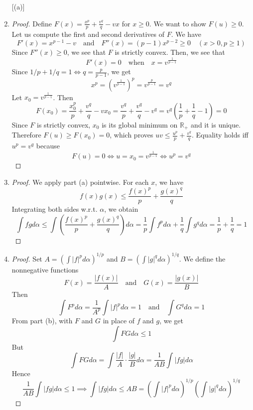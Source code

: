 \documentclass[11pt]{article}
\begin{document}
\begin{exercise}{6.10}
\begin{enumerate} [(a)]
    \item \begin{proof}
        Define $F(x) = \frac{x^p}{p} + \frac{v^q}{q} - vx$ for $x \ge 0$. We want to show $F(u) \ge 0$. Let us compute the first and second derivatives of $F$. We have $$F'(x) = x^{p- 1} - v \quad \text{and} \quad F''(x) = (p - 1)x^{p - 2} \ge 0 \quad(x > 0, p \ge1)$$ Since $F''(x) \ge 0$, we see that $F$ is strictly convex. Then, we see that $$F'(x) = 0 \quad \text{when} \quad x = v^{\frac{1}{p-1}}$$ Since $1/p + 1/q = 1 \iff q = \frac{p}{p - 1}$, we get $$x^p = \left( v^{\frac{1}{p - 1}} \right)^p = v^{\frac{p}{p - 1}} = v^q$$ Let $x_0 = v^{\frac{1}{p - 1}}$. Then $$F(x_0) = \frac{x_0^p}{p} + \frac{v^q}{q} - vx_0 = \frac{v^q}{p} + \frac{v^q}{q} - v^q = v^q \left( \frac{1}{p} + \frac{1}{q} - 1 \right) = 0$$ Since $F$ is strictly convex, $x_0$ is its global minimum on $\mathbb{R}_+$ and it is unique. Therefore $F(u) \ge F(x_0) = 0$, which proves $uv \le \frac{u^p}{p} + \frac{v^q}{q}$. Equality holds iff $u^p = v^q$ because $$F(u) = 0 \iff u = x_0 = v^{\frac{1}{p - 1}} \iff u^p = v^q$$
    \end{proof}
    \item \begin{proof}
        We apply part (a) pointwise. For each $x$, we have $$f(x) g(x) \le \frac{f(x)^p}{p} + \frac{g(x)^q}{q}$$ Integrating both sides w.r.t. $\alpha$, we obtain $$\int fg d\alpha \le \int \left( \frac{f(x)^p}{p} + \frac{g(x)^q}{q} \right) d\alpha = \frac{1}{p} \int f^p d\alpha + \frac{1}{q} \int g^q d \alpha = \frac{1}{p} + \frac{1}{q} = 1$$
    \end{proof}
    \item \begin{proof}
        Set $A = \left( \int |f|^p d\alpha \right)^{1/p}$ and $B = \left( \int |g|^q d\alpha \right)^{1/q}$. We define the nonnegative functions $$F(x) = \frac{|f(x)|}{A} \quad \text{and} \quad G(x) = \frac{|g(x)|}{B}$$ Then $$\int F^p d\alpha = \frac{1}{A^p} \int |f|^p d \alpha = 1 \quad \text{and} \quad \int G^q d \alpha = 1$$ From part (b), with $F$ and $G$ in place of $f$ and $g$, we get $$\int FG d \alpha \le 1$$ But $$\int FG d \alpha = \int \frac{|f|}{A} \cdot \frac{|g|}{B} d \alpha = \frac{1}{AB} \int |fg| d \alpha$$ Hence $$\frac{1}{AB} \int |fg| d \alpha \le 1 \implies \int |fg| d \alpha \le AB = \left( \int |f|^p d\alpha \right)^{1/p} \left( \int |g|^q d\alpha \right)^{1/q}$$
    \end{proof}
\end{enumerate}
\end{exercise}
\end{document}

